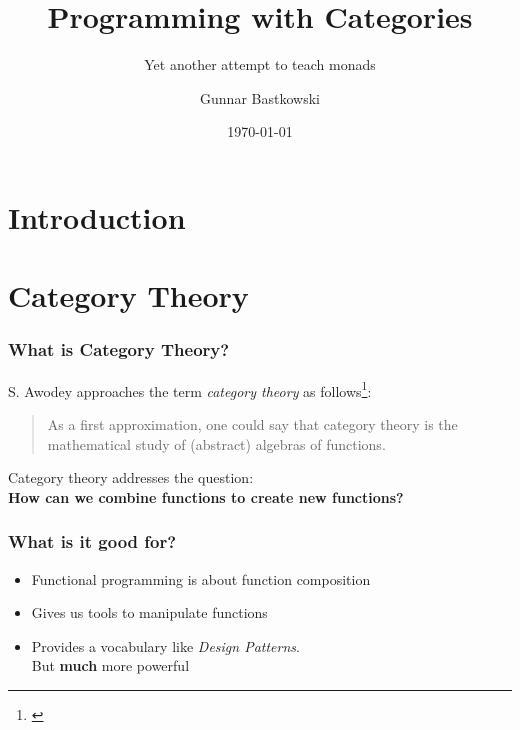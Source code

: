 \documentclass{beamer}
\title{Programming with Categories}
\subtitle{Yet another attempt to teach monads}
\author{Gunnar Bastkowski}
\date{\today}
\begin{document}
\maketitle
\frame{\tableofcontents[currentsection]}

\section{Introduction}


\section{Category Theory}
\begin{frame}
  \frametitle{What is Category Theory?}

  S. Awodey approaches the term {\it category theory} as follows\footnote{\cite{awodey2010category}}:
  \begin{quote}
    As a first approximation, one could say that category theory
    is the mathematical study of (abstract) {algebras of functions}.
  \end{quote}

  \begin{center}
    Category theory addresses the question:\\
    {\bf How can we combine functions to create new functions?}
  \end{center}
\end{frame}

\begin{frame}
  \frametitle{What is it good for?}
  \begin{itemize}
  \item Functional programming is about function composition
  \item Gives us tools to manipulate functions
  \item Provides a vocabulary like {\it Design Patterns}.\\
    But {\bf much} more powerful
  \end{itemize}

\end{frame}
\end{document}
